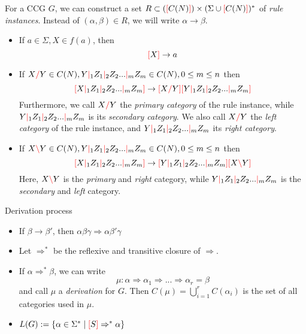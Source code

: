 \documentclass[main.tex]{subfiles}
\begin{document}
\begin{defn}
    For a CCG $G$, we can construct a set $R \subset (\textcolor{red}{[} C(N) \textcolor{red}{]}) \times (\Sigma \cup \textcolor{red}{[} C(N) \textcolor{red}{]})^*$
    of \emph{rule instances}. Instead of $(\alpha, \beta) \in R$, we will write
    $\alpha \rightarrow \beta$.

    \begin{itemize}
        \item If $ a \in \Sigma, X \in f(a) $, then \[ \textcolor{red}{[} X \textcolor{red}{]} \rightarrow a \]
        \item If $ X \textcolor{red}{/} Y \in C(N), Y \textcolor{red}{|}_1 Z_1 \textcolor{red}{|}_2 Z_2 ... \textcolor{red}{|}_m Z_m \in C(N), 0 \leq m \leq n $
            then \[ \textcolor{red}{[} X \textcolor{red}{|}_1 Z_1 \textcolor{red}{|}_2 Z_2 ... \textcolor{red}{|}_m Z_m \textcolor{red}{]} \rightarrow \textcolor{red}{[} X \textcolor{red}{/} Y \textcolor{red}{]} \textcolor{red}{[} Y \textcolor{red}{|}_1 Z_1 \textcolor{red}{|}_2 Z_2 ... \textcolor{red}{|}_m Z_m \textcolor{red}{]} \]
            Furthermore, we call $ X \textcolor{red}{/} Y $ the \emph{primary category} of the rule
            instance, while $ Y \textcolor{red}{|}_1 Z_1 \textcolor{red}{|}_2 Z_2 ... \textcolor{red}{|}_m Z_m $ is its
            \emph{secondary category}.
            We also call $ X \textcolor{red}{/} Y $ the \emph{left category} of the rule instance,
            and $  Y \textcolor{red}{|}_1 Z_1 \textcolor{red}{|}_2 Z_2 ... \textcolor{red}{|}_m Z_m $ its \emph{right category}.
        \item If $ X \textcolor{red}{\backslash} Y \in C(N), Y \textcolor{red}{|}_1 Z_1 \textcolor{red}{|}_2 Z_2 ... \textcolor{red}{|}_m Z_m \in C(N), 0 \leq m \leq n $
            then \[ \textcolor{red}{[} X \textcolor{red}{|}_1 Z_1 \textcolor{red}{|}_2 Z_2 ... \textcolor{red}{|}_m Z_m \textcolor{red}{]} \rightarrow \textcolor{red}{[} Y \textcolor{red}{|}_1 Z_1 \textcolor{red}{|}_2 Z_2 ... \textcolor{red}{|}_m Z_m \textcolor{red}{]} \textcolor{red}{[} X \textcolor{red}{\backslash} Y \textcolor{red}{]} \]
            Here, $ X \textcolor{red}{\backslash} Y $ is the \emph{primary} and \emph{right} category,
            while $ Y \textcolor{red}{|}_1 Z_1 \textcolor{red}{|}_2 Z_2 ... \textcolor{red}{|}_m Z_m $ is the \emph{secondary}
            and \emph{left} category.
    \end{itemize}
\end{defn}

\begin{defn}
    Derivation process
    \begin{itemize}
        \item If $\beta \rightarrow \beta'$, then $\alpha \beta \gamma \Rightarrow \alpha \beta' \gamma$
        \item Let $\Rightarrow^*$ be the reflexive and transitive closure of $\Rightarrow$.
        \item If $\alpha \Rightarrow^* \beta$, we can write
            \[ \mu: \alpha \Rightarrow \alpha_1 \Rightarrow ... \Rightarrow \alpha_r = \beta \]
            and call $\mu$ a \emph{derivation} for $G$. Then $C(\mu) = \bigcup\limits_{i=1}^{r} C(\alpha_i)$
            is the set of all categories used in $\mu$.
        \item $L(G) := \{ \alpha \in \Sigma^* \mid \textcolor{red}{[} S \textcolor{red}{]} \Rightarrow^* \alpha \}$
    \end{itemize}
\end{defn}
\end{document}
